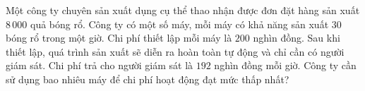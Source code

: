 \begin{bt}%
Một công ty chuyên sản xuất dụng cụ thể thao nhận được đơn đặt hàng sản xuất $8\,000$ quả bóng rổ. Công ty có một số máy, mỗi máy có khả năng sản xuất $30$ bóng rổ trong một giờ. Chi phí thiết lập mỗi máy là $200$ nghìn đồng. Sau khi thiết lập, quá trình sản xuất sẽ diễn ra hoàn toàn tự động và chỉ cần có người giám sát. Chi phí trả cho người giám sát là $192$ nghìn đồng mỗi giờ. Công ty cần sử dụng bao nhiêu máy để chi phí hoạt động đạt mức thấp nhất?
\end{bt}

